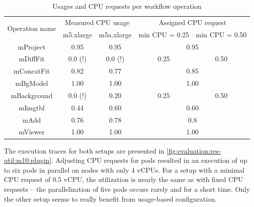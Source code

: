 \begin{table}[H]
    \centering
    \begin{tabular}{|c|c|c|c|c|}
    \cline{1-5}
        \multirow{2}{*}{Operation name} 
        &
        \multicolumn{2}{|c|}{Measured CPU usage}
        &
        \multicolumn{2}{|c|}{Assigned CPU request}  \\
    \cline{2-5}
        & m5.xlarge & m5a.xlarge & min CPU = 0.25 & min CPU = 0.50 \\
    \cline{1-5}
        mProject & 0.95 & 0.95 & \multicolumn{2}{|c|}{0.95} \\
    \cline{1-5}
        mDiffFit & 0.0 (!) & 0.0 (!) & 0.25 & 0.50 \\
    \cline{1-5}
        mConcatFit & 0.82 & 0.77 & \multicolumn{2}{|c|}{0.85} \\
    \cline{1-5}
        mBgModel & 1.00 & 1.00 & \multicolumn{2}{|c|}{1.00} \\
    \cline{1-5}
        mBackground & 0.0 (!) & 0.20 & 0.25 & 0.50 \\
    \cline{1-5}
        mImgtbl & 0.44 & 0.60 & \multicolumn{2}{|c|}{0.60} \\
    \cline{1-5}
        mAdd & 0.76 & 0.78 & \multicolumn{2}{|c|}{0.8} \\
    \cline{1-5}
        mViewer & 1.00 & 1.00 & \multicolumn{2}{|c|}{1.00} \\
    \cline{1-5}
    \end{tabular}
    \caption{Usages and CPU requests per workflow operation}
    \label{tab:res-util:setup}
\end{table}


The execution traces for both setups are presented in \cref{fig:evaluation:res-util:m10:plugin}.
Adjusting CPU requests for pods resulted in an execution of up to six pods in parallel on nodes with only 4 vCPUs.
For a setup with a minimal CPU request of 0.5 vCPU, the utilization is nearly the same as with fixed CPU requests -- the parallelization of five pods occurs rarely and for a short time.
Only the other setup seems to really benefit from usage-based configuration.


